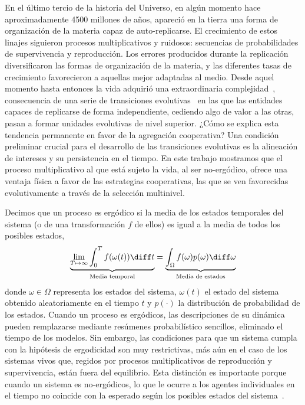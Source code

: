 \documentclass[a4paper,10pt]{article}
\begin{document}
En el último tercio de la historia del Universo, en algún momento hace aproximadamente 4500 millones de años, apareció en la tierra una forma de organización de la materia capaz de auto-replicarse.
El crecimiento de estos linajes siguieron procesos multiplicativos y ruidosos: secuencias de probabilidades de supervivencia y reproducción.
Los errores producidos durante la replicación diversificaron las formas de organización de la materia, y las diferentes tasas de crecimiento favorecieron a aquellas mejor adaptadas al medio.
Desde aquel momento hasta entonces la vida adquirió una extraordinaria complejidad~\cite{barOn2018-biomass}, consecuencia de una serie de transiciones evolutivas~\cite{maynardSmith1995-majorTransitions} en las que las entidades capaces de replicarse de forma independiente, cediendo algo de valor a las otras, pasan a formar unidades evolutivas de nivel superior.
¿Cómo se explica esta tendencia permanente en favor de la agregación cooperativa?
Una condición preliminar crucial para el desarrollo de las transiciones evolutivas es la alineación de intereses y su persistencia en el tiempo.
En este trabajo mostramos que el proceso multiplicativo al que está sujeto la vida, al ser no-ergódico, ofrece una ventaja física a favor de las estrategias cooperativas, las que se ven favorecidas evolutivamente a través de la selección multinivel.

Decimos que un proceso es ergódico si la media de los estados temporales del sistema (o de una transformación $f$ de ellos) es igual a la media de todos los posibles estados,
\begin{equation}
 \underbrace{\lim_{T \mapsto \infty} \int_0^T f(\omega(t)) \diff t}_{\text{Media temporal}}  = \underbrace{\int_{\Omega} f(\omega)p(\omega) \diff\omega}_{\text{Media de estados}}
\end{equation}
donde $\omega \in \Omega$ representa los estados del sistema, $\omega(t)$ el estado del sistema obtenido aleatoriamente en el tiempo $t$ y $p(\cdot)$ la distribución de probabilidad de los estados.
Cuando un proceso es ergódicos, las descripciones de su dinámica pueden remplazarse mediante resúmenes probabilístico sencillos, eliminado el tiempo de los modelos.
Sin embargo, las condiciones para que un sistema cumpla con la hipótesis de ergodicidad son muy restrictivas, más aún en el caso de los sistemas vivos que, regidos por procesos multiplicativos de reproducción y supervivencia, están fuera del equilibrio.
Esta distinción es importante porque cuando un sistema es no-ergódicos, lo que le ocurre a los agentes individuales en el tiempo no coincide con la esperado según los posibles estados del sistema~\cite{peters2019-ergodicityEconomics}.
\end{document}
